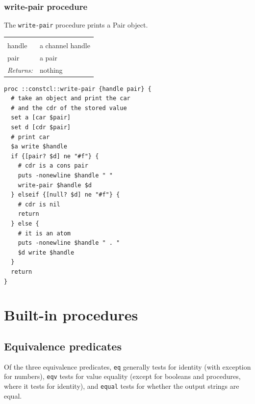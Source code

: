 \documentclass[twoside,9pt]{report}
\begin{document}
\subsection{write-pair procedure}
\label{write-pair-procedure}


The \texttt{write-pair} procedure prints a Pair object.

\noindent\begin{tabular}{ |p{1.5cm} p{8cm}| }
\hline
\rowcolor[HTML]{CCCCCC} \multicolumn{2}{|l|}{\bf write-pair (internal)} \\
handle & a channel handle \\
pair & a pair \\
\textit{Returns:} & nothing \\
\hline
\end{tabular}
\begin{lstlisting}
proc ::constcl::write-pair {handle pair} {
  # take an object and print the car
  # and the cdr of the stored value
  set a [car $pair]
  set d [cdr $pair]
  # print car
  $a write $handle
  if {[pair? $d] ne "#f"} {
    # cdr is a cons pair
    puts -nonewline $handle " "
    write-pair $handle $d
  } elseif {[null? $d] ne "#f"} {
    # cdr is nil
    return
  } else {
    # it is an atom
    puts -nonewline $handle " . "
    $d write $handle
  }
  return
}
\end{lstlisting}
\chapter{Built-in procedures}
\label{built-in-procedures}
\section{Equivalence predicates}
\label{equivalence-predicates}


Of the three equivalence predicates, \texttt{eq} generally tests for identity (with exception for numbers), \texttt{eqv} tests for value equality (except for booleans and procedures, where it tests for identity), and \texttt{equal} tests for whether the output strings are equal.
\end{document}
